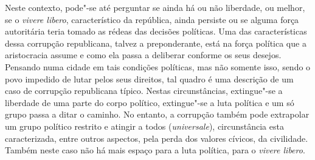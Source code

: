 Neste contexto, pode"-se até perguntar se ainda há ou não liberdade, ou
melhor, se o \emph{vivere libero}, característico da república, ainda
persiste ou se alguma força autoritária teria tomado as rédeas das
decisões políticas. Uma das características dessa corrupção republicana,
talvez a preponderante, está na força política que a aristocracia assume
e como ela passa a deliberar conforme os seus desejos. Pensando numa
cidade em tais condições políticas, mas não somente isso, sendo o povo
impedido de lutar pelos seus direitos, tal quadro é uma descrição de um
caso de corrupção republicana típico. Nestas circunstâncias, extingue"-se
a liberdade de uma parte do corpo político, extingue"-se a luta política
e um só grupo passa a ditar o caminho. No entanto, a corrupção também
pode extrapolar um grupo político restrito e atingir a todos
(\emph{universale}), circunstância esta caracterizada, entre outros
aspectos, pela perda dos valores cívicos, da civilidade. Também neste
caso não há mais espaço para a luta política, para o \emph{vivere
libero}.

